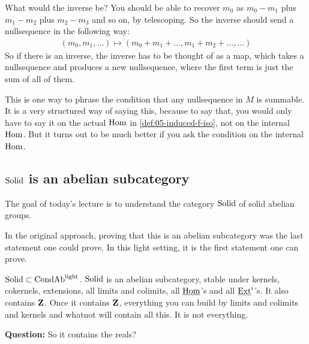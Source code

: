 What would the inverse be? You should be able to recover $m_0$ as $m_0 - m_1$ plus $m_1 - m_2$ plus $m_2 - m_3$ and so on, by telescoping. 
So the inverse should send a nullsequence in the following way:
\begin{align*}
(m_0, m_1, \ldots) \mapsto (m_0 + m_1 + \ldots , m_1 + m_2 + \ldots, \ldots)
\end{align*}
So if there is an inverse, the inverse has to be thought of as a map, which takes a nullsequence and produces a new nullsequence, where the first term is just the sum of all of them.

This is one way to phrase the condition that any nullsequence in $M$ is summable. It is a very structured way of saying this, because to say that, you would only have to say it on the actual $\operatorname{Hom}$ in \ref{def:05-induced-f-iso}, not on the internal $\operatorname{Hom}$. 
But it turns out to be much better if you ask the condition on the internal $\operatorname{Hom}$.

\subsection{$\mathrm{Solid}$ is an abelian subcategory}

\begin{goal}
The goal of today's lecture is to understand the category $\mathrm{Solid}$ of solid abelian groups. 
\end{goal}

In the original approach, proving that this is an abelian subcategory  was the last statement one could prove. In this light setting, it is the first statement one can prove.

\begin{proposition} \label{prop:solid-05}
$\mathrm{Solid} \subset \mathrm{Cond}\mathrm{Ab}^{\mathrm{light}}$. $\mathrm{Solid}$ is an abelian subcategory, stable under kernels, cokernels, extensions, all limits and colimits, all $\operatorname{\underline{Hom}}$'s and all $\operatorname{\underline{Ext}}^i$'s.
It also contains $\mathbf Z$.
Once it contains $\mathbf Z$, everything you can build by limits and colimits and kernels and whatnot will contain all this. It is not everything.
\end{proposition} 

\textbf{Question:} So it contains the reals?

